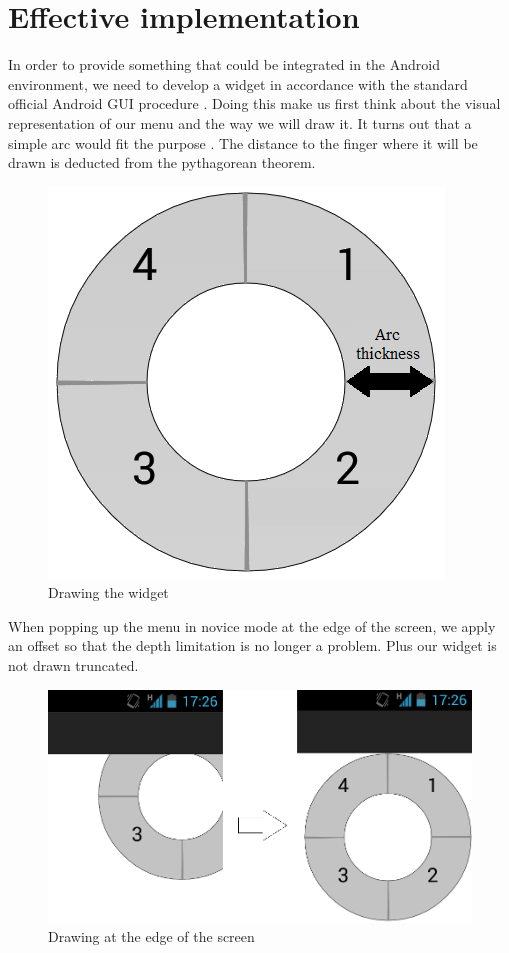 \documentclass[conference]{IEEEtran}
\begin{document}
\section{Effective implementation}
In order to provide something that could be integrated in the Android environment, we need to develop a widget in accordance with the standard official Android GUI procedure \cite{android}. Doing this make us first think about the visual representation of our menu and the way we will draw it. It turns out that a simple arc would fit the purpose \cite{touchmenotapps}. The distance to the finger where it will be drawn is deducted from the pythagorean theorem.

\begin{figure}[!ht] 
		\centering
		\includegraphics[scale = 0.5]{figure4.png} %
		\caption{Drawing the widget}
		\label{linear-marking_menus}
\end{figure}

When popping up the menu in novice mode at the edge of the screen, we apply an offset so that the depth limitation is no longer a problem. Plus our widget is not drawn truncated.

\begin{figure}[!ht] 
		\centering
		\includegraphics[width=\columnwidth]{figure5.png}
		\caption{Drawing at the edge of the screen}
		\label{linear-marking_menus}
\end{figure}
\end{document}
